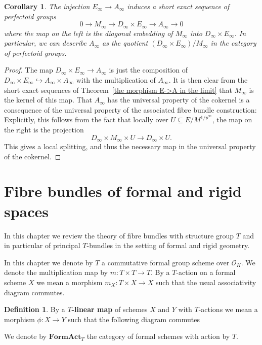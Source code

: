 \documentclass[10pt,oneside]{amsart}
\newtheorem{corollary}[theorem]{Corollary}
\theoremstyle{definition}
\newtheorem{definition}[theorem]{Definition}
\begin{document}
	\begin{corollary}
		The injection $E_\infty \rightarrow A_\infty$ induces a short exact sequence of perfectoid groups
		\[0\rightarrow M_\infty\rightarrow D_\infty \times E_\infty \rightarrow A_\infty\rightarrow 0\]
		where the map on the left is the diagonal embedding of $M_\infty$ into $D_\infty\times E_\infty$. In particular, we can describe $A_\infty$ as the quotient $(D_\infty\times E_\infty)/M_\infty$ in the category of perfectoid groups.
	\end{corollary}
	\begin{proof}
		The map $D_\infty\times E_\infty \rightarrow A_\infty$ is just the composition of $D_\infty\times E_\infty \hookrightarrow A_\infty\times A_\infty$ with the multiplication of $A_\infty$. It is then clear from the short exact sequences of Theorem~\ref{the morphism E->A in the limit} that $M_\infty$ is the kernel of this map. That $A_\infty$ has the universal property of the cokernel is a consequence of the universal property of the associated fibre bundle construction: Explicitly, this follows from the fact that locally over $U\subseteq E/M^{1/p^\infty}$, the map on the right is the projection
		\[D_\infty \times M_\infty \times U \rightarrow D_\infty\times U.\]
		This gives a local splitting, and thus the necessary map in the universal property of the cokernel.
	\end{proof}
	
	\appendix
	\section{Fibre bundles of formal and rigid spaces}
	In this chapter we review the theory of fibre bundles with structure group $T$ and in particular of principal $T$-bundles in the setting of formal and rigid geometry.
		
	
	
	In this chapter we denote by $T$ a commutative formal group scheme over $\mathcal O_K$. We denote the multiplication map by $m:T\times T\rightarrow T$. By a $T$-action on a formal scheme $X$ we mean a morphism $m_X:T\times X\rightarrow X$ such that the usual associativity diagram commutes. 
	\begin{definition}
		By a \textbf{$T$-linear map} of schemes $X$ and $Y$ with $T$-actions we mean a morphism $\phi:X\rightarrow Y$ such that the following diagram commutes
		\begin{center}
		\end{center}
		We denote by $\mathbf{FormAct}_T$ the category of formal schemes with action by $T$.
	\end{definition}
	
\end{document}
